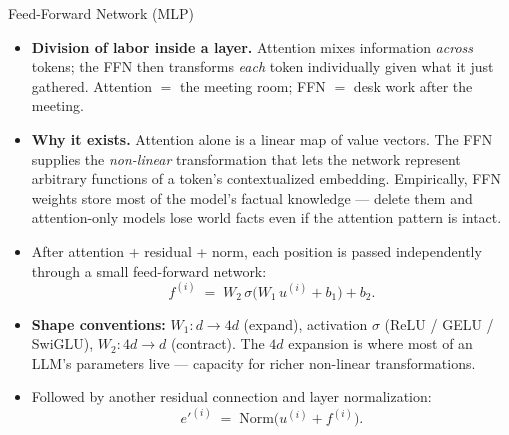 \begin{frame}{Feed-Forward Network (MLP)}
\begin{itemize}
\item \textbf{Division of labor inside a layer.} Attention mixes information \emph{across} tokens; the FFN then transforms \emph{each} token individually given what it just gathered. Attention $=$ the meeting room; FFN $=$ desk work after the meeting.

\medskip
\item \textbf{Why it exists.} Attention alone is a linear map of value vectors. The FFN supplies the \emph{non-linear} transformation that lets the network represent arbitrary functions of a token's contextualized embedding. Empirically, FFN weights store most of the model's factual knowledge --- delete them and attention-only models lose world facts even if the attention pattern is intact.

\medskip
\item After attention + residual + norm, each position is passed independently through a small feed-forward network:
\[
   f^{(i)} \;=\; W_{2}\,\sigma\bigl(W_{1}\,u^{(i)} + b_{1}\bigr) + b_{2}.
\]

\medskip
\item \textbf{Shape conventions:} $W_{1}\colon d \!\rightarrow\! 4d$ (expand), activation $\sigma$ (ReLU / GELU / SwiGLU), $W_{2}\colon 4d \!\rightarrow\! d$ (contract). The $4d$ expansion is where most of an LLM's parameters live --- capacity for richer non-linear transformations.

\medskip
\item Followed by another residual connection and layer normalization:
\[
   e'^{(i)} \;=\; \mathrm{Norm}\bigl(u^{(i)} + f^{(i)}\bigr).
\]
\end{itemize}
\end{frame}

